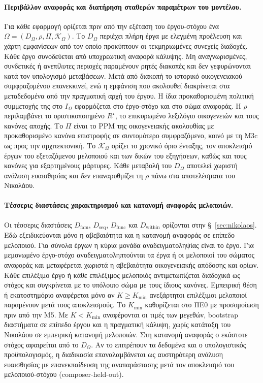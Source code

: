 \documentclass[11pt,a4paper]{article}
\begin{document}
\paragraph{Περιβάλλον αναφοράς και διατήρηση σταθερών παραμέτρων του μοντέλου.}
Για κάθε εφαρμογή ορίζεται πριν από την εξέταση του έργου-στόχου ένα $\Omega=(D_{\Omega},\rho,\Pi,\mathcal K_{\Omega})$. Το $D_{\Omega}$ περιέχει πλήρη έργα με ελεγμένη προέλευση και χάρτη εμφανίσεων από τον οποίο προκύπτουν οι τεκμηριωμένες συνεχείς διαδοχές. Κάθε έργο συνοδεύεται από υποχρεωτική αναφορά κάλυψης. Μη αναγνωρισμένες, συνδετικές ή ανεπίλυτες περιοχές παραμένουν ρητές διακοπές και δεν γεφυρώνονται κατά τον υπολογισμό μεταβάσεων. Μετά από διακοπή το ιστορικό οικογενειακού συμφραζομένου επανεκκινεί, ενώ η εμφάνιση που ακολουθεί διακρίνεται στα μεταδεδομένα από την πραγματική αρχή του έργου. Η ίδια προκαθορισμένη πολιτική συμμετοχής της στο $I_{\Omega}$ εφαρμόζεται στο έργο-στόχο και στο σώμα αναφοράς. Η $\rho$ περιλαμβάνει το οριστικοποιημένο $R^\star$, το επικυρωμένο λεξιλόγιο οικογενειών και τους κανόνες αποχής. Το $\Pi$ είναι το PPM της οικογενειακής ακολουθίας με προκαθορισμένο κανόνα επιστροφής σε συντομότερο συμφραζόμενο, κοινό με τη M3c ως προς την αρχιτεκτονική. Το $\mathcal K_{\Omega}$ ορίζει το χρονικό όριο ένταξης, τον αποκλεισμό έργων του εξεταζόμενου μελοποιού και των δικών του εξηγήσεων, καθώς και τους κανόνες για εξαρτημένους μάρτυρες. Κάθε μεταβολή του $D_{\Omega}$ αποτελεί χωριστή ανάλυση ευαισθησίας και δεν επαναρυθμίζει τη $\rho$ πάνω στα αποτελέσματα του Νικολάου.

\paragraph{Τέσσερις διαστάσεις χαρακτηρισμού και κατανομή αναφοράς μελοποιών.}
Οι τέσσερις διαστάσεις $D_{\mathrm{fam}}$, $D_{\mathrm{seq}}$, $D_{\mathrm{func}}$ και $D_{\mathrm{within}}$ ορίζονται στην §~\ref{sec:nikolaos}. Εδώ εξειδικεύονται μόνο η αβεβαιότητα και η κατανομή αναφοράς σε επίπεδο μελοποιού. Για σύνολα έργων η κύρια μονάδα αναδειγματοληψίας είναι το έργο. Για μεμονωμένο έργο-στόχο αναδειγματοληπτούνται τα έργα ή οι μελοποιοί του σώματος αναφοράς και μεταφέρεται χωριστά η αβεβαιότητα οικογενειακής απόδοσης και ορίων. Κάθε επιλέξιμο έργο ή κάθε επιλέξιμος μελοποιός αντιμετωπίζεται διαδοχικά ως στόχος και συγκρίνεται με το υπόλοιπο σώμα με τους ίδιους κανόνες. Εμπειρική θέση ή εκατοστημόριο αναφέρεται μόνο αν $K\ge K_{\min}$ ανεξάρτητοι επιλέξιμοι μελοποιοί παραμένουν μετά τους αποκλεισμούς. Το $K_{\min}$ καθορίζεται στο ΠΕ0 με προσομοίωση πριν από την M5. Με $K<K_{\min}$ αναφέρονται οι τιμές των μεγεθών, bootstrap διαστήματα σε επίπεδο έργου και η πραγματική κάλυψη, χωρίς κατάταξη του Νικολάου σε εμπειρική κατανομή μελοποιών. Στη κατανομή αναφοράς ο εκάστοτε στόχος αφαιρείται από το $D_{\Omega}$. Αν το επιτρέπουν τα δεδομένα και ο υπολογιστικός προϋπολογισμός, η διαδικασία επαναλαμβάνεται ως αυστηρότερη ανάλυση ευαισθησίας με επανεκπαίδευση της αναπαράστασης μετά τον αποκλεισμό του μελοποιού-στόχου (composer-held-out).
\end{document}
